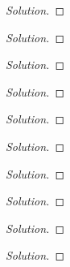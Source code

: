 \begin{exercise}
\end{exercise}
\begin{proof}[Solution]
\end{proof}

\begin{exercise}
\end{exercise}
\begin{proof}[Solution]
\end{proof}

\begin{exercise}
\end{exercise}
\begin{proof}[Solution]
\end{proof}

\begin{exercise}
\end{exercise}
\begin{proof}[Solution]
\end{proof}

\begin{exercise}
\end{exercise}
\begin{proof}[Solution]
\end{proof}

\begin{exercise}
\end{exercise}
\begin{proof}[Solution]
\end{proof}

\begin{exercise}
\end{exercise}
\begin{proof}[Solution]
\end{proof}

\begin{exercise}
\end{exercise}
\begin{proof}[Solution]
\end{proof}

\begin{exercise}
\end{exercise}
\begin{proof}[Solution]
\end{proof}

\begin{exercise}
\end{exercise}
\begin{proof}[Solution]
\end{proof}

